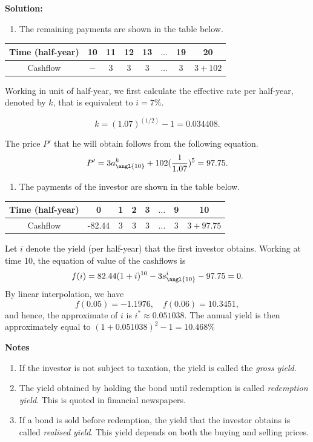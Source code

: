 \documentclass[
]{book}
\providecommand{\tightlist}{%
  \setlength{\itemsep}{0pt}\setlength{\parskip}{0pt}}
\theoremstyle{definition}
\theoremstyle{definition}
\theoremstyle{definition}
\theoremstyle{definition}
\theoremstyle{remark}
\begin{document}
\textbf{Solution:}

\begin{enumerate}
\def\labelenumi{\arabic{enumi}.}
\tightlist
\item
  The remaining payments are shown in the table below.
\end{enumerate}

\begin{longtable}[]{@{}cccccccc@{}}
\toprule
Time (half-year) & 10 & 11 & 12 & 13 & \(\ldots\) & 19 & 20 \\
\midrule
\endhead
Cashflow & \(-\) & 3 & 3 & 3 & \(\ldots\) & \(3\) & \(3 + 102\) \\
\bottomrule
\end{longtable}

Working in unit of half-year, we first calculate the effective rate per
half-year, denoted by \(k\), that is equivalent to \(i = 7\%\).

\[ k = (1.07)^{(1/2)} - 1 = 0.034408. \]

The price \(P'\) that he will obtain follows from the following equation.
\[P' = 3 a^k_{\angl{10}} + 102 (\frac{1}{1.07})^{5} = 97.75.\]

\begin{enumerate}
\def\labelenumi{\arabic{enumi}.}
\setcounter{enumi}{1}
\tightlist
\item
  The payments of the investor are shown in the table below.
\end{enumerate}

\begin{longtable}[]{@{}cccccccc@{}}
\toprule
Time (half-year) & 0 & 1 & 2 & 3 & \(\ldots\) & 9 & 10 \\
\midrule
\endhead
Cashflow & -82.44 & 3 & 3 & 3 & \(\ldots\) & \(3\) & \(3 + 97.75\) \\
\bottomrule
\end{longtable}

Let \(i\) denote the yield (per half-year) that the first investor
obtains. Working at time 10, the equation of value of the cashflows is
\[ f(i) = 82.44 (1+i)^{10} - 3 s^i_{\angl{10}} - 97.75 = 0.\] By linear
interpolation, we have \[ f(0.05) = -1.1976, \quad f(0.06) = 10.3451, \]
and hence, the approximate of \(i\) is \(i^* \approx 0.051038\). The annual
yield is then approximately equal to \((1 + 0.051038)^2 - 1 = 10.468\%\)

\textbf{Notes}

\begin{enumerate}
\def\labelenumi{\arabic{enumi}.}
\item
  If the investor is not subject to taxation, the yield is called the
  \emph{gross yield}.
\item
  The yield obtained by holding the bond until redemption is called
  \emph{redemption yield}. This is quoted in financial newspapers.
\item
  If a bond is sold before redemption, the yield that the investor
  obtains is called \emph{realised yield}. This yield depends on both the
  buying and selling prices.
\end{enumerate}
\end{document}
